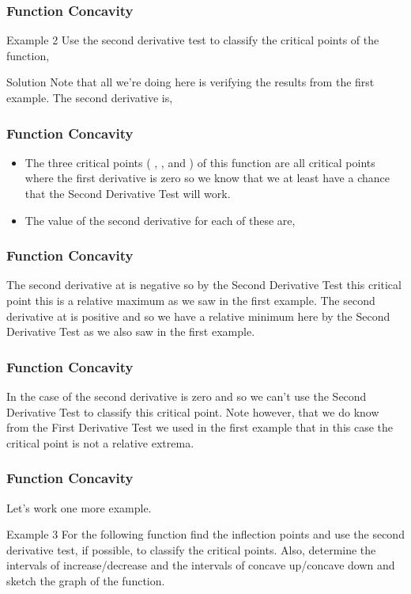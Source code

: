 \documentclass{beamer}
\begin{document}
\begin{frame} 
	\frametitle{Function Concavity}  
 Example 2  Use the second derivative test to classify the critical points of the function,
 
 
 Solution
 Note that all we’re doing here is verifying the results from the first example.  The second derivative is,
 
\end{frame}
\begin{frame} 
	\frametitle{Function Concavity} 
	\begin{itemize}
 \item The three critical points ( ,  , and  ) of this function are all critical points where the first derivative is zero so we know that we at least have a chance that the Second Derivative Test will work.  
 \item The value of the second derivative for each of these are,
 \end{itemize}
\end{frame}
\begin{frame} 
	\frametitle{Function Concavity} 
 The second derivative at  is negative so by the Second Derivative Test this critical point this is a relative maximum as we saw in the first example.  The second derivative at   is positive and so we have a relative minimum here by the Second Derivative Test as we also saw in the first example.
\end{frame}
\begin{frame} 
	\frametitle{Function Concavity} 
 In the case of  the second derivative is zero and so we can’t use the Second Derivative Test to classify this critical point.  Note however, that we do know from the First Derivative Test we used in the first example that in this case the critical point is not a relative extrema.
\end{frame}
\begin{frame} 
	\frametitle{Function Concavity}  
 Let’s work one more example.
 
 Example 3  For the following function find the inflection points and use the second derivative test, if possible, to classify the critical points.  Also, determine the intervals of increase/decrease and the intervals of concave up/concave down and sketch the graph of the function.
\end{frame}
\end{document}
